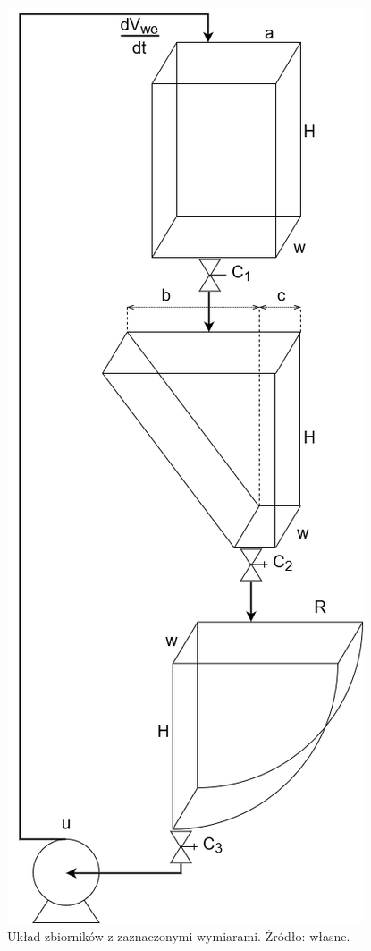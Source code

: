 \begin{figure}[hpt]
	\centering
	\includegraphics[scale=.5]{Grafika/schemat_zbiornikow}
	\caption{Układ zbiorników z zaznaczonymi wymiarami. Źródło: własne.}\label{fig:zbiorniki}
\end{figure}




